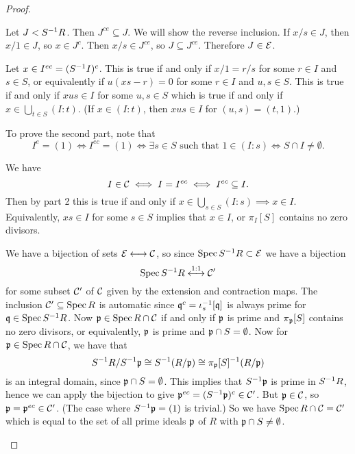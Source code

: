 \begin{proof}
  \leavevmode
  \begin{enum}
    \io
    Let $J<S^{-1} R$.
    Then $J^{ce} \subseteq J$.
    We will show the reverse inclusion.
    If $x/s \in J$, then $x/1 \in J$, so $x \in J^c$.
    Then $x/s \in J^{ce}$, so $J \subseteq J^{ce}$.
    Therefore $J \in \mathcal{E}$.

    \io
    Let $x \in I^{ec} = (S^{-1} I)^c$.
    This is true if and only if $x/1=r/s$ for some $r \in I$ and $s \in S$, or equivalently if $u(xs-r)=0$ for some $r \in I$ and $u,s \in S$.
    This is true if and only if $xus \in I$ for some $u,s \in S$ which is true if and only if $x \in \bigcup_{t \in S} (I:t)$.
    (If $x \in (I:t)$, then $xus \in I$ for $(u,s)=(t,1)$.)

    To prove the second part, note that
    \[I^e = (1) \iff I^{ec} = (1) \iff \exists s \in S \text{ such that } 1 \in (I:s) \iff S \cap I \neq \emptyset.\]

    \io
    We have
    \[I \in \mathcal{C} \iff I = I^{ec} \iff I^{ec} \subseteq I.\]
    Then by part 2 this is true if and only if $x \in \bigcup_{s \in S} (I:s) \implies x \in I$.
    Equivalently, $xs \in I$ for some $s \in S$ implies that $x \in I$, or $\pi_I[S]$ contains no zero divisors.

    \io
    We have a bijection of sets $\mathcal{E} \longleftrightarrow \mathcal{C}$, so since $\operatorname{Spec} S^{-1} R \subset \mathcal{E}$ we have a bijection
    \[\operatorname{Spec} S^{-1} R \overset{1:1}{\longleftrightarrow} \mathcal{C}'\]
    for some subset $\mathcal{C}'$ of $\mathcal{C}$ given by the extension and contraction maps.
    The inclusion $\mathcal{C}' \subseteq \operatorname{Spec} R$ is automatic since $\mathfrak{q}^c = \iota_s^{-1}[\mathfrak{q}]$ is always prime for $\mathfrak{q} \in \operatorname{Spec} S^{-1} R$.
    Now $\mathfrak{p} \in \operatorname{Spec} R \cap \mathcal{C}$ if and only if $\mathfrak{p}$ is prime and $\pi_{\mathfrak{p}}[S]$ contains no zero divisors, or equivalently, $\mathfrak{p}$ is prime and $\mathfrak{p} \cap S = \emptyset$.
    Now for $\mathfrak{p} \in \operatorname{Spec} R \cap \mathcal{C}$, we have that
    \[S^{-1} R / S^{-1} \mathfrak{p} \cong S^{-1}(R/\mathfrak{p}) \cong \pi_{\mathfrak{p}}[S]^{-1} (R/\mathfrak{p})\]
    is an integral domain, since $\mathfrak{p} \cap S = \emptyset$.
    This implies that $S^{-1} \mathfrak{p}$ is prime in $S^{-1} R$, hence we can apply the bijection to give $\mathfrak{p}^{ec} = (S^{-1} \mathfrak{p})^c \in \mathcal{C}'$. 
    But $\mathfrak{p} \in \mathcal{C}$, so $\mathfrak{p}=\mathfrak{p}^{ec} \in \mathcal{C}'$.
    (The case where $S^{-1}\mathfrak{p}=(1)$ is trivial.)
    So we have $\operatorname{Spec} R \cap \mathcal{C} = \mathcal{C}'$ which is equal to the set of all prime ideals $\mathfrak{p}$ of $R$ with $\mathfrak{p} \cap S \neq \emptyset$.
    \qedhere
  \end{enum}
\end{proof}
